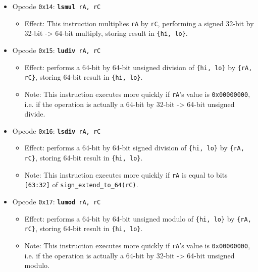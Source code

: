 \documentclass{article}
\begin{document}
\begin{itemize}
\begin{itemize}
		\end{itemize}
		\item Opcode \texttt{0x14}:
			\texttt{\textbf{lsmul} rA, rC}
		\begin{itemize}
			\item Effect:  This instruction multiplies \texttt{rA} by
			\texttt{rC}, performing a signed 32-bit by 32-bit -> 64-bit
			multiply, storing result in \texttt{\{hi, lo\}}.
		\end{itemize}
		\item Opcode \texttt{0x15}:
			\texttt{\textbf{ludiv} rA, rC}
		\begin{itemize}
			\item Effect:  performs a 64-bit by 64-bit unsigned division of
			\texttt{\{hi, lo\}} by \texttt{\{rA, rC\}}, storing 64-bit
			result in \texttt{\{hi, lo\}}.
			\item Note:  This instruction executes more quickly if
			\texttt{rA}'s value is \texttt{0x00000000}, i.e. if the
			operation is actually a 64-bit by 32-bit -> 64-bit unsigned
			divide.
		\end{itemize}
		\item Opcode \texttt{0x16}:
			\texttt{\textbf{lsdiv} rA, rC}
		\begin{itemize}
			\item Effect:  performs a 64-bit by 64-bit signed division of
			\texttt{\{hi, lo\}} by \texttt{\{rA, rC\}}, storing 64-bit
			result in \texttt{\{hi, lo\}}.
			\item Note:  This instruction executes more quickly if
			\texttt{rA} is equal to bits \texttt{[63:32]} of
			\texttt{sign\_extend\_to\_64(rC)}.
		\end{itemize}
		\item Opcode \texttt{0x17}:
			\texttt{\textbf{lumod} rA, rC}
		\begin{itemize}
			\item Effect:  performs a 64-bit by 64-bit unsigned modulo of
			\texttt{\{hi, lo\}} by \texttt{\{rA, rC\}}, storing 64-bit
			result in \texttt{\{hi, lo\}}.
			\item Note:  This instruction executes more quickly if
			\texttt{rA}'s value is \texttt{0x00000000}, i.e. if the
			operation is actually a 64-bit by 32-bit -> 64-bit unsigned
			modulo.

\end{itemize}
\end{itemize}
\end{document}
